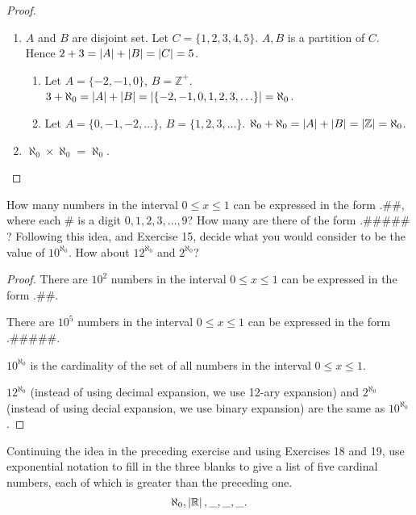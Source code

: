 \begin{proof}
    \begin{enumerate}[label={\textbf{\alph*.}}]
        \item $A$ and $B$ are disjoint set. Let $C = \{ 1, 2, 3, 4, 5 \}$. $A, B$ is a partition of $C$. Hence $2 + 3 = \left\vert{A}\right\vert + \left\vert{B}\right\vert = \left\vert{C}\right\vert = 5$.
              \begin{enumerate}[label={\roman*.}]
                  \item Let $A = \{ -2, -1, 0 \}$, $B = \mathbb{Z}^{+}$. $3 + \aleph_{0} = \left\vert{A}\right\vert + \left\vert{B}\right\vert = \left\vert{\{ -2, -1, 0, 1, 2, 3,\ldots \}}\right\vert = \aleph_{0}$.
                  \item Let $A = \{ 0, -1, -2,\ldots \}$, $B = \{ 1, 2, 3, \ldots \}$. $\aleph_{0} + \aleph_{0} = \left\vert{A}\right\vert + \left\vert{B}\right\vert = \left\vert{\mathbb{Z}}\right\vert = \aleph_{0}$.
              \end{enumerate}
        \item $\aleph_{0}\times\aleph_{0} = \aleph_{0}$.
    \end{enumerate}
\end{proof}

\begin{exercise}
    How many numbers in the interval $0\le x\le 1$ can be expressed in the form $.\#\#$, where each $\#$ is a digit $0, 1, 2, 3,\ldots, 9$? How many are there of the form $.\#\#\#\#\#$? Following this idea, and Exercise 15, decide what you would consider to be the value of $10^{\aleph_{0}}$. How about $12^{\aleph_{0}}$ and $2^{\aleph_{0}}$?
\end{exercise}

\begin{proof}
    There are $10^{2}$ numbers in the interval $0\le x\le 1$ can be expressed in the form $.\#\#$.

    There are $10^{5}$ numbers in the interval $0\le x\le 1$ can be expressed in the form $.\#\#\#\#\#$.

    $10^{\aleph_{0}}$ is the cardinality of the set of all numbers in the interval $0\le x\le 1$.

    $12^{\aleph_{0}}$ (instead of using decimal expansion, we use 12-ary expansion) and $2^{\aleph_{0}}$ (instead of using decial expansion, we use binary expansion) are the same as $10^{\aleph_{0}}$.
\end{proof}

\begin{exercise}
    Continuing the idea in the preceding exercise and using Exercises 18 and 19, use exponential notation to fill in the three blanks to give a list of five cardinal numbers, each of which is greater than the preceding one.
    \[
        \aleph_{0}, \left\vert{\mathbb{R}}\right\vert, \_, \_, \_.
    \]
\end{exercise}

